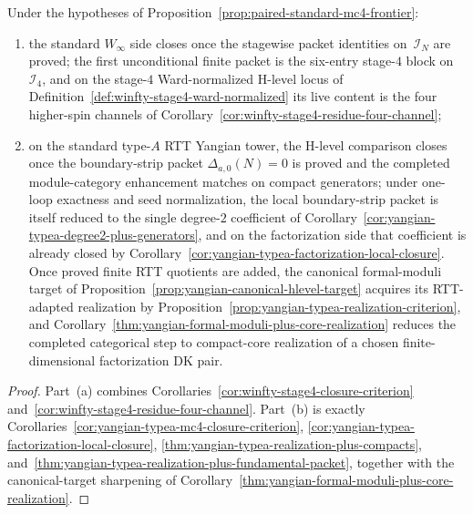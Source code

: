 \begin{corollary}
\label{cor:paired-standard-mc4-closure}
Under the hypotheses of
Proposition~\ref{prop:paired-standard-mc4-frontier}:
\begin{enumerate}[label=\textup{(\alph*)}]
\item the standard \texorpdfstring{$W_\infty$}{W_infty} side closes once
 the stagewise packet identities on~$\mathcal{I}_N$ are proved; the
 first unconditional finite packet is the six-entry stage-$4$ block
 on~$\mathcal{I}_4$, and on the stage-$4$ Ward-normalized H-level
 locus of Definition~\ref{def:winfty-stage4-ward-normalized} its live
 content is the four higher-spin channels of
 Corollary~\ref{cor:winfty-stage4-residue-four-channel};
\item on the standard type-$A$ RTT Yangian tower, the H-level
 comparison closes once the boundary-strip packet
 $\Delta_{a,0}(N)=0$ is proved and the completed module-category
 enhancement matches on compact generators; under one-loop exactness
 and seed normalization, the local boundary-strip packet is itself
 reduced to the single degree-$2$ coefficient of
 Corollary~\ref{cor:yangian-typea-degree2-plus-generators}, and on
 the factorization side that coefficient is already closed by
 Corollary~\ref{cor:yangian-typea-factorization-local-closure}. Once
 proved finite RTT quotients are added, the canonical formal-moduli
 target of Proposition~\ref{prop:yangian-canonical-hlevel-target}
 acquires its RTT-adapted realization by
 Proposition~\ref{prop:yangian-typea-realization-criterion}, and
 Corollary~\ref{thm:yangian-formal-moduli-plus-core-realization}
 reduces the completed categorical step to compact-core realization of
 a chosen finite-dimensional factorization DK pair.
\end{enumerate}
\end{corollary}

\begin{proof}
Part~\textup{(a)} combines
Corollaries~\ref{cor:winfty-stage4-closure-criterion}
and~\ref{cor:winfty-stage4-residue-four-channel}. Part~\textup{(b)} is
exactly
Corollaries~\ref{cor:yangian-typea-mc4-closure-criterion},
\ref{cor:yangian-typea-factorization-local-closure},
\ref{thm:yangian-typea-realization-plus-compacts},
and~\ref{thm:yangian-typea-realization-plus-fundamental-packet},
together with the canonical-target sharpening of
Corollary~\ref{thm:yangian-formal-moduli-plus-core-realization}.
\end{proof}

